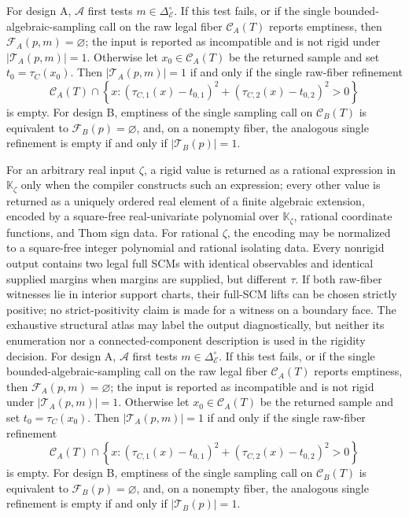 For design A, \(\mathscr A\) first tests \(m\in\Delta_{\mathcal E}^{\circ}\).  If this test fails, or if the single bounded-algebraic-sampling call on the raw legal fiber \(\mathcal C_A(T)\) reports emptiness, then \(\mathcal F_A(p,m)=\varnothing\); the input is reported as incompatible and is not rigid under \(|\mathcal T_A(p,m)|=1\).  Otherwise let \(x_0\in\mathcal C_A(T)\) be the returned sample and set \(t_0=\tau_C(x_0)\).  Then \(|\mathcal T_A(p,m)|=1\) if and only if the single raw-fiber refinement
\[
\mathcal C_A(T)\cap\left\{x:
(\tau_{C,1}(x)-t_{0,1})^2+(\tau_{C,2}(x)-t_{0,2})^2>0
\right\}
\]
is empty.  For design B, emptiness of the single sampling call on \(\mathcal C_B(T)\) is equivalent to \(\mathcal F_B(p)=\varnothing\), and, on a nonempty fiber, the analogous single refinement is empty if and only if \(|\mathcal T_B(p)|=1\).

For an arbitrary real input \(\zeta\), a rigid value is returned as a rational expression in \(\mathbb K_{\zeta}\) only when the compiler constructs such an expression; every other value is returned as a uniquely ordered real element of a finite algebraic extension, encoded by a square-free real-univariate polynomial over \(\mathbb K_{\zeta}\), rational coordinate functions, and Thom sign data.  For rational \(\zeta\), the encoding may be normalized to a square-free integer polynomial and rational isolating data.  Every nonrigid output contains two legal full SCMs with identical observables and identical supplied margins when margins are supplied, but different \(\tau\).  If both raw-fiber witnesses lie in interior support charts, their full-SCM lifts can be chosen strictly positive; no strict-positivity claim is made for a witness on a boundary face.  The exhaustive structural atlas may label the output diagnostically, but neither its enumeration nor a connected-component description is used in the rigidity decision.
For design A, \(\mathscr A\) first tests \(m\in\Delta_{\mathcal E}^{\circ}\).  If this test fails, or if the single bounded-algebraic-sampling call on the raw legal fiber \(\mathcal C_A(T)\) reports emptiness, then \(\mathcal F_A(p,m)=\varnothing\); the input is reported as incompatible and is not rigid under \(|\mathcal T_A(p,m)|=1\).  Otherwise let \(x_0\in\mathcal C_A(T)\) be the returned sample and set \(t_0=\tau_C(x_0)\).  Then \(|\mathcal T_A(p,m)|=1\) if and only if the single raw-fiber refinement
\[
\mathcal C_A(T)\cap\left\{x:
(\tau_{C,1}(x)-t_{0,1})^2+(\tau_{C,2}(x)-t_{0,2})^2>0
\right\}
\]
is empty.  For design B, emptiness of the single sampling call on \(\mathcal C_B(T)\) is equivalent to \(\mathcal F_B(p)=\varnothing\), and, on a nonempty fiber, the analogous single refinement is empty if and only if \(|\mathcal T_B(p)|=1\).

